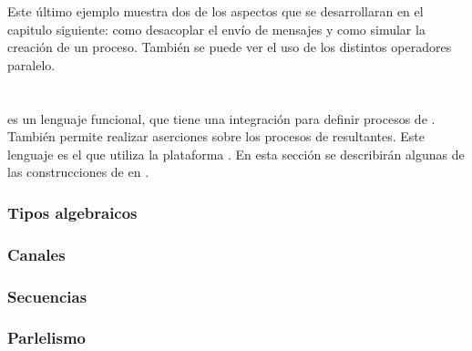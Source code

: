 Este último ejemplo muestra dos de los aspectos que se desarrollaran en el capitulo siguiente: como desacoplar el envío de mensajes y como simular la creación de un proceso. También se puede ver el uso de los distintos operadores paralelo.
 
\section{\CSPm}

\CSPm es un lenguaje funcional, que tiene una integración para definir procesos de \CSP. También permite realizar aserciones sobre los procesos de \CSP resultantes. Este lenguaje es el que utiliza la plataforma \FDR. En esta sección se describirán algunas de las construcciones de \CSP en \CSPm.

\subsubsection{Tipos algebraicos}

\subsubsection{Canales}


\subsubsection{Secuencias}

\subsubsection{Parlelismo}



